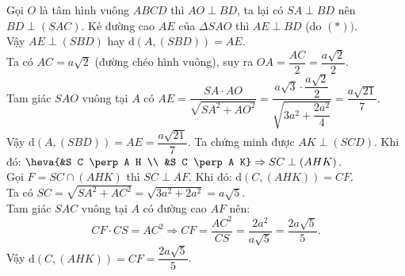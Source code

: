 \begin{ex}
{\begin{itemchoice}
	\itemch Gọi $O$ là tâm hình vuông $A B C D$ thì $A O \perp B D$, ta lại có $S A \perp B D$ nên $B D \perp(S A C)$.\tagEX{*}
	\noindent Kẻ đường cao $A E$ của $\Delta S A O$ thì $A E \perp B D$ (do $(*))$.\\
	Vậy $A E \perp(S B D)$ hay $\mathrm{d}(A,(S B D))=A E$.\\
	Ta có $A C=a \sqrt{2}$ (đường chéo hình vuông), suy ra $O A=\dfrac{A C}{2}=\dfrac{a \sqrt{2}}{2}$.\\
	Tam giác $S A O$ vuông tại $A$ có $A E=\dfrac{S A \cdot A O}{\sqrt{S A^2+A O^2}}=\dfrac{a \sqrt{3} \cdot \dfrac{a \sqrt{2}}{2}}{\sqrt{3 a^2+\dfrac{2 a^2}{4}}}=\dfrac{a \sqrt{21}}{7}$.\\
	Vậy $\mathrm{d}(A,(S B D))={AE}=\dfrac{a \sqrt{21}}{7}$.
	\itemch Ta chứng minh được $A K \perp(S C D)$. Khi đó: $\heva{&S C \perp A H \\ &S C \perp A K} \Rightarrow S C \perp(A H K)$.\\
	Gọi $F=S C \cap(A H K)$ thì $S C \perp A F$. 
	Khi đó: $\mathrm{d}(C,(A H K))=C F$.\\
	Ta có $S C=\sqrt{S A^2+A C^2}=\sqrt{3 a^2+2 a^2}=a \sqrt{5}$.\\
	Tam giác $S A C$ vuông tại $A$ có đường cao $A F$ nên:
	$$CF\cdot CS=AC^2\Rightarrow CF=\dfrac{AC^2}{CS}=\dfrac{2a^2}{a\sqrt{5}}=\dfrac{2a\sqrt{5}}{5}.$$
	Vậy $\mathrm{d}(C,(AHK))=CF=\dfrac{2a\sqrt{5}}{5}$.
\end{itemchoice}
}
\end{ex}
